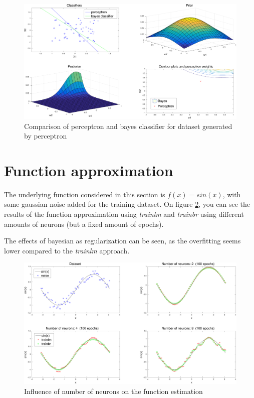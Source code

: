 \documentclass[11pt, a4paper]{article}
\begin{document}
\begin{figure}[H]
    \centering
    \includegraphics[scale=.40]{perceptron_bayes.pdf}
    \caption{Comparison of perceptron and bayes classifier for dataset
      generated by perceptron}
    \label{fig:perceptron_bayes}
\end{figure}

\section{Function approximation}

The underlying function considered in this section is $f(x)=sin(x)$,
with some gaussian noise added for the training dataset. On figure
\ref{fig:trainbr}, you can see the results of the function
approximation using \emph{trainlm} and \emph{trainbr} using different
amounts of neurons (but a fixed amount of epochs). 

The effects of bayesian as regularization can be seen, as the
overfitting seems lower compared to the \emph{trainlm} approach. 

\begin{figure}[H]
  \centering
  \includegraphics[scale=.40]{bayes_trainbrlm.pdf}
  \caption{Influence of number of neurons on the function estimation}
  \label{fig:trainbr}
\end{figure}
\end{document}
